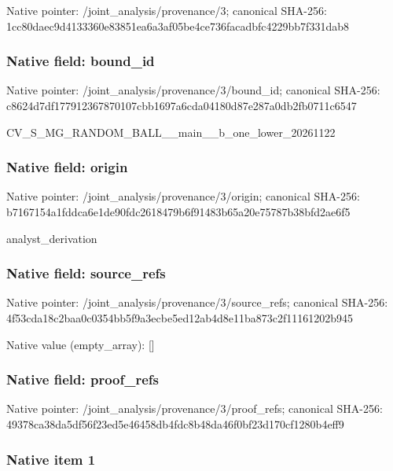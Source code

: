 \documentclass[10pt,a4paper]{article}
\begin{document}
Native pointer: /joint\_analysis/provenance/3; canonical SHA-256: 1cc80daec9d4133360e83851\allowbreak{}ea6a3af05be4ce736facadbf\allowbreak{}c4229bb7f331dab8



\subsubsection{Native field: bound\_id}


Native pointer: /joint\_analysis/provenance/3/bound\_id; canonical SHA-256: c8624d7df177912367870107\allowbreak{}cbb1697a6cda04180d87e287\allowbreak{}a0db2fb0711c6547


CV\_S\_MG\_RANDOM\_BALL\_\_mai\allowbreak{}n\_\_b\_one\_lower\_20261122


\subsubsection{Native field: origin}


Native pointer: /joint\_analysis/provenance/3/origin; canonical SHA-256: b7167154a1fddca6e1de90fd\allowbreak{}c2618479b6f91483b65a20e7\allowbreak{}5787b38bfd2ae6f5


analyst\_derivation


\subsubsection{Native field: source\_refs}


Native pointer: /joint\_analysis/provenan\allowbreak{}ce/3/source\_refs; canonical SHA-256: 4f53cda18c2baa0c0354bb5f\allowbreak{}9a3ecbe5ed12ab4d8e11ba87\allowbreak{}3c2f11161202b945



Native value (empty\_array): []



\subsubsection{Native field: proof\_refs}


Native pointer: /joint\_analysis/provenance/3/proof\_refs; canonical SHA-256: 49378ca38da5df56f23ed5e4\allowbreak{}6458db4fdc8b48da46f0bf23\allowbreak{}d170cf1280b4eff9



\subsubsection{Native item 1}
\end{document}
